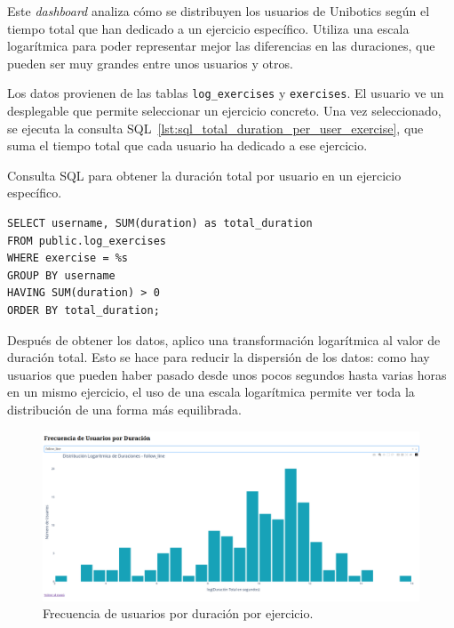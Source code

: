 \documentclass[a4paper, 12pt]{book}
\begin{document}
Este \textit{dashboard} analiza cómo se distribuyen los usuarios de Unibotics según el tiempo total que han dedicado a un ejercicio específico. Utiliza una escala logarítmica para poder representar mejor las diferencias en las duraciones, que pueden ser muy grandes entre unos usuarios y otros.

Los datos provienen de las tablas \texttt{log\_exercises} y \texttt{exercises}. El usuario ve un desplegable que permite seleccionar un ejercicio concreto. Una vez seleccionado, se ejecuta la consulta SQL~\ref{lst:sql_total_duration_per_user_exercise}, que suma el tiempo total que cada usuario ha dedicado a ese ejercicio.

\begin{listing}[h!]
\caption{Consulta SQL para obtener la duración total por usuario en un ejercicio específico.}
\label{lst:sql_total_duration_per_user_exercise}
\begin{verbatim}
SELECT username, SUM(duration) as total_duration
FROM public.log_exercises
WHERE exercise = %s
GROUP BY username
HAVING SUM(duration) > 0
ORDER BY total_duration;
\end{verbatim}
\end{listing}

Después de obtener los datos, aplico una transformación logarítmica al valor de duración total. Esto se hace para reducir la dispersión de los datos: como hay usuarios que pueden haber pasado desde unos pocos segundos hasta varias horas en un mismo ejercicio, el uso de una escala logarítmica permite ver toda la distribución de una forma más equilibrada.

\begin{figure}[H]
  \centering
  \includegraphics[width=1.1\textwidth]{img/3a.png}
  \caption{Frecuencia de usuarios por duración por ejercicio.}
  \label{fig:3a}
\end{figure}
\end{document}
